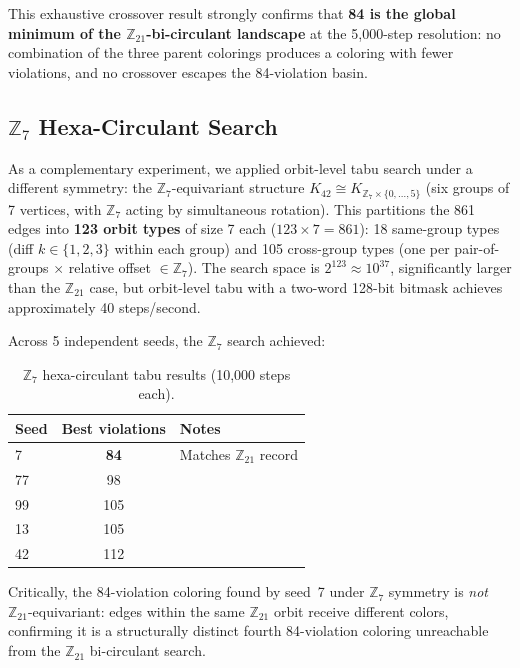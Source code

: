 \documentclass[11pt]{article}
\begin{document}
This exhaustive crossover result strongly confirms that
\textbf{84 is the global minimum of the $\mathbb{Z}_{21}$-bi-circulant landscape}
at the 5,000-step resolution: no combination of the three parent colorings
produces a coloring with fewer violations, and no crossover escapes the 84-violation basin.

\subsection{$\mathbb{Z}_7$ Hexa-Circulant Search}

As a complementary experiment, we applied orbit-level tabu search under a
different symmetry: the $\mathbb{Z}_7$-equivariant structure
$K_{42} \cong K_{\mathbb{Z}_7 \times \{0,\ldots,5\}}$
(six groups of 7 vertices, with $\mathbb{Z}_7$ acting by simultaneous rotation).
This partitions the 861 edges into \textbf{123 orbit types} of size 7 each
($123 \times 7 = 861$): 18 same-group types (diff $k \in \{1,2,3\}$ within each group)
and 105 cross-group types (one per pair-of-groups $\times$ relative offset $\in \mathbb{Z}_7$).
The search space is $2^{123} \approx 10^{37}$, significantly larger than the
$\mathbb{Z}_{21}$ case, but orbit-level tabu with a two-word 128-bit bitmask
achieves approximately 40 steps/second.

Across 5 independent seeds, the $\mathbb{Z}_7$ search achieved:

\begin{table}[h]
\centering
\begin{tabular}{lcl}
\toprule
Seed & Best violations & Notes \\
\midrule
7  & \textbf{84} & Matches $\mathbb{Z}_{21}$ record \\
77 & 98  & \\
99 & 105 & \\
13 & 105 & \\
42 & 112 & \\
\bottomrule
\end{tabular}
\caption{$\mathbb{Z}_7$ hexa-circulant tabu results (10,000 steps each).}
\label{tab:z7}
\end{table}

Critically, the 84-violation coloring found by seed~7 under $\mathbb{Z}_7$
symmetry is \emph{not} $\mathbb{Z}_{21}$-equivariant: edges within the same
$\mathbb{Z}_{21}$ orbit receive different colors, confirming it is a structurally
distinct fourth 84-violation coloring unreachable from the $\mathbb{Z}_{21}$
bi-circulant search.
\end{document}
